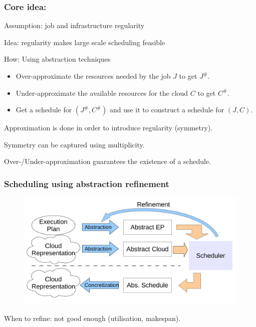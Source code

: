 \documentclass{beamer}
\begin{document}
\begin{frame}
  \frametitle{Core idea:}
  Assumption: job and infrastructure \alert{regularity} 

  \vspace{1ex}

  Idea: regularity makes large scale scheduling feasible

  \vspace{1ex}

  How: Using abstraction techniques

  \vspace{1ex}

  \begin{itemize}
  \item Over-approximate the resources needed by the job $J$ to get $J^\#$.
  \item Under-approximate the available resources for the cloud $C$ to get $C^\#$.
  \item Get a schedule for $(J^\#,C^\#)$ and use it to construct a schedule for $(J,C)$.
  \end{itemize}
  
  \vspace{1ex}

  Approximation is done in order to introduce regularity (symmetry).
  
  Symmetry can be captured using multiplicity.

  Over-/Under-approximation guarantees the existence of a schedule.

\end{frame}


\begin{frame}
  \frametitle{Scheduling using abstraction refinement}

  \begin{figure}
    \includegraphics[scale=0.35]{abs_scheduling}
  \end{figure}

  When to refine: not good enough (utilisation, makespan).

\end{frame}
\end{document}
